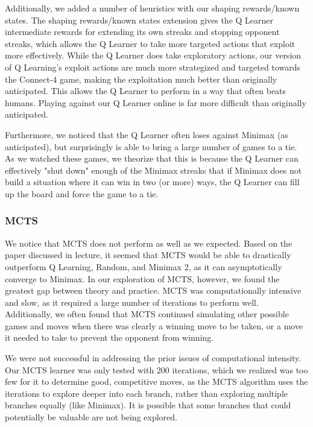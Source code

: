 \documentclass[12pt]{article}
\begin{document}
Additionally, we added a number of heuristics with our shaping rewards/known states. The shaping rewards/known states extension gives the Q Learner intermediate rewards for extending its own streaks and stopping opponent streaks, which allows the Q Learner to take more targeted actions that exploit more effectively. While the Q Learner does take exploratory actions, our version of Q Learning's exploit actions are much more strategized and targeted towards the Connect-4 game, making the exploitation much better than originally anticipated. This allows the Q Learner to perform in a way that often beats humans. Playing against our Q Learner online is far more difficult than originally anticipated.

Furthermore, we noticed that the Q Learner often loses against Minimax (as anticipated), but surprisingly is able to bring a large number of games to a tie. As we watched these games, we theorize that this is because the Q Learner can effectively "shut down" enough of the Minimax streaks that if Minimax does not build a situation where it can win in two (or more) ways, the Q Learner can fill up the board and force the game to a tie.

\subsubsection{MCTS}

We notice that MCTS does not perform as well as we expected. Based on the paper discussed in lecture, it seemed that MCTS would be able to drastically outperform Q Learning, Random, and Minimax 2, as it can asymptotically converge to Minimax. In our exploration of MCTS, however, we found the greatest gap between theory and practice. MCTS was computationally intensive and slow, as it required a large number of iterations to perform well. Additionally, we often found that MCTS continued simulating other possible games and moves when there was clearly a winning move to be taken, or a move it needed to take to prevent the opponent from winning. 

We were not successful in addressing the prior issues of computational intensity. Our MCTS learner was only tested with 200 iterations, which we realized was too few for it to determine good, competitive moves, as the MCTS algorithm uses the iterations to explore deeper into each branch, rather than exploring multiple branches equally (like Minimax). It is possible that some branches that could potentially be valuable are not being explored. 
\end{document}
